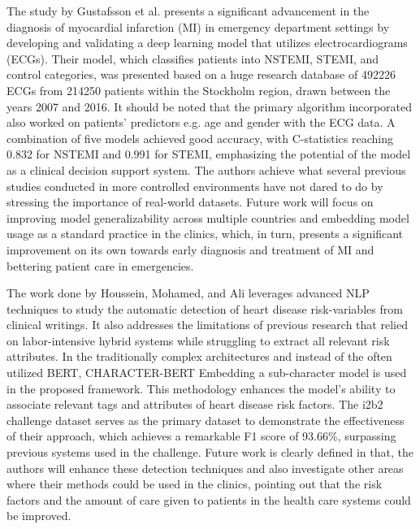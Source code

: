 The study by Gustafsson et al. presents a significant advancement in the diagnosis of myocardial infarction (MI) in emergency department settings by developing and validating a deep learning model that utilizes electrocardiograms (ECGs). Their model, which classifies patients into NSTEMI, STEMI, and control categories, was presented based on a huge research database of 492226 ECGs from 214250 patients within the Stockholm region, drawn between the years 2007 and 2016. It should be noted that the primary algorithm incorporated also worked on patients’ predictors e.g. age and gender with the ECG data. A combination of five models achieved good accuracy, with C-statistics reaching 0.832 for NSTEMI and 0.991 for STEMI, emphasizing the potential of the model as a clinical decision support system. The authors achieve what several previous studies conducted in more controlled environments have not dared to do by stressing the importance of real-world datasets. Future work will focus on improving model generalizability across multiple countries and embedding model usage as a standard practice in the clinics, which, in turn, presents a significant improvement on its own towards early diagnosis and treatment of MI and bettering patient care in emergencies.
\vspace{0.5cm}

The work done by Houssein, Mohamed, and Ali leverages advanced NLP techniques to study the automatic detection of heart disease risk-variables from clinical writings. It also addresses the limitations of previous research that relied on labor-intensive hybrid systems while struggling to extract all relevant risk attributes. In the traditionally complex architectures and instead of the often utilized BERT, CHARACTER-BERT Embedding a sub-character model is used in the proposed framework. This methodology enhances the model’s ability to associate relevant tags and attributes of heart disease risk factors. The i2b2 challenge dataset serves as the primary dataset to demonstrate the effectiveness of their approach, which achieves a remarkable F1 score of 93.66\%, surpassing previous systems used in the challenge. Future work is clearly defined in that, the authors will enhance these detection techniques and also investigate other areas where their methods could be used in the clinics, pointing out that the risk factors and the amount of care given to patients in the health care systems could be improved.
\vspace{0.5cm}



